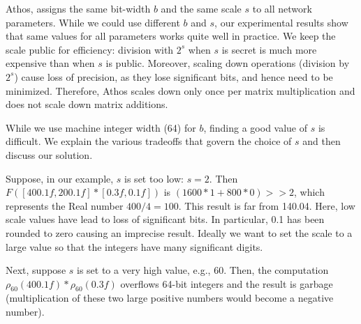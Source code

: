 Athos, assigns the same bit-width $b$ and the same scale $s$ to all
network parameters. While we could use different $b$ and $s$, our
experimental results show that same values for all parameters works
quite well in practice.
We keep the scale public for efficiency: division with $2^s$ when $s$ is secret is much more expensive than when $s$ is public.
Moreover, scaling down operations (division by $2^s$) cause loss of precision, as they lose significant bits, and hence need to be minimized.
 Therefore, Athos scales down only once per matrix multiplication and does not scale down matrix additions.


While we use machine integer width (64) for $b$, finding a good value
of $s$ is difficult. We explain the various tradeoffs that
govern the choice of $s$ and then discuss our solution.

Suppose, in our example, $s$ is set too low: $s=2$.
Then $F([400.1f,200.1f]*[0.3f,0.1f])$ is $(1600*1+800*0)>>2$,
which represents the Real number $400/4=100$.
This result is far from 140.04. Here, low scale values have lead to
loss of significant bits. In particular, 0.1 has been rounded to zero
causing an imprecise result. Ideally we want to set the scale to a large value
so that the integers have many significant digits.

Next, suppose $s$ is set to a very high value, e.g., 60. Then, the
computation $\rho_{60}(400.1f)*\rho_{60}(0.3f)$ overflows 64-bit integers and
the result is garbage
(multiplication of these two large positive numbers would become a negative number).  

